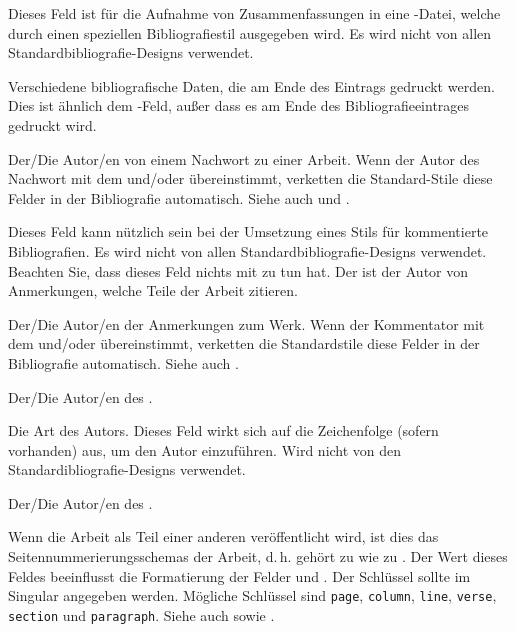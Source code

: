 \documentclass{ltxdockit}[2011/03/25]
\begin{document}
\begin{fieldlist}


Dieses Feld ist für die Aufnahme von Zusammenfassungen in eine -Datei,
welche durch einen speziellen Bibliografiestil ausgegeben wird. Es wird nicht
von allen Standardbibliografie-Designs verwendet.


Verschiedene bibliografische Daten, die am Ende des Eintrags gedruckt werden.
Dies ist ähnlich dem -Feld, außer dass es am Ende des
Bibliografieeintrages gedruckt wird.


Der/Die Autor/en von einem Nachwort zu einer Arbeit. Wenn der Autor des Nachwort
mit dem  und\slash oder  übereinstimmt,
verketten die Standard-Stile diese Felder in der Bibliografie automatisch.
Siehe auch  und .


Dieses Feld kann nützlich sein bei der Umsetzung eines Stils für kommentierte
Bibliografien. Es wird nicht von allen Standardbibliografie-Designs
verwendet. Beachten Sie, dass dieses Feld nichts mit  zu tun
hat. Der  ist der Autor von Anmerkungen, welche Teile der
Arbeit zitieren.


Der/Die Autor/en der Anmerkungen zum Werk. Wenn der Kommentator mit dem
 und\slash oder  übereinstimmt, verketten
die Standardstile diese Felder in der Bibliografie automatisch. Siehe auch
.


Der/Die Autor/en des .


Die Art des Autors. Dieses Feld wirkt sich auf die Zeichenfolge (sofern
vorhanden) aus, um den  Autor einzuführen. Wird nicht von den 
Standardibliografie-Designs verwendet.


Der/Die Autor/en des .


Wenn die Arbeit als Teil einer anderen veröffentlicht wird, ist dies das
Seitennummerierungsschemas der Arbeit, d.\,h.  gehört
zu  wie  zu . Der Wert
dieses Feldes beeinflusst die Formatierung der Felder  und
. Der Schlüssel sollte im Singular angegeben werden.
Mögliche Schlüssel sind \texttt{page}, \texttt{column}, \texttt{line},
\texttt{verse}, \texttt{section} und \texttt{paragraph}. 
Siehe auch  sowie .


\end{fieldlist}
\end{document}
